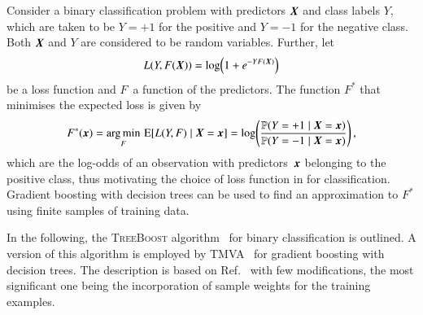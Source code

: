 Consider a binary classification problem with predictors $\myvec{X}$ and class
labels $Y$, which are taken to be $Y = +1$ for the positive and $Y = -1$ for the
negative class. Both $\myvec{X}$ and $Y$ are considered to be random
variables. Further, let
\begin{align}
  L(Y, F(\myvec{X})) = \log\mathopen{}\left(
  1 + e^{-Y F(\myvec{X})}
  \right)\mathclose{}
  \label{eq:loss_gradboost}
\end{align}
be a loss function and $F$~a function of the predictors. The function $F^*$ that
minimises the expected loss is given by
\begin{align}
  F^*(\myvec{x})
  = \argmin_F \, \expect[ L(Y, F) \mid \myvec{X} = \myvec{x} ]
  = \log\mathopen{}\left(
  \frac{
  \mathbb{P}(Y = +1 \mid \myvec{X} = \myvec{x})
  }{
  \mathbb{P}(Y = -1 \mid \myvec{X} = \myvec{x})
  }
  \right)\mathclose{} \,\text{,}
  \label{eq:gradboost_logodds}
\end{align}
which are the log-odds of an observation with predictors~$\myvec{x}$ belonging
to the positive class, thus motivating the choice of loss function in
 for classification.
Gradient boosting with decision trees can be used to find an approximation to
$F^*$ using finite samples of training data.

In the following, the \textsc{TreeBoost} algorithm~\cite{Friedman:2001wbq} for
binary classification is outlined. A version of this algorithm is employed by
\textsc{TMVA}~\cite{TMVA} for gradient boosting with decision trees. The
description is based on Ref.~\cite{Friedman:2001wbq} with few modifications, the
most significant one being the incorporation of sample weights for the training
examples.

